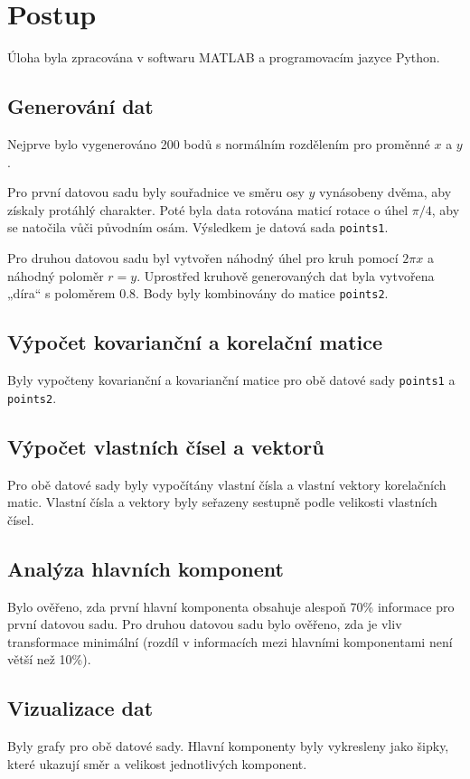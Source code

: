 \section{Postup}

Úloha byla zpracována v softwaru MATLAB a programovacím jazyce Python.

\subsection{Generování dat}
Nejprve bylo vygenerováno 200 bodů s normálním rozdělením pro proměnné \(x\) a \(y\).

Pro první datovou sadu byly souřadnice ve směru osy \(y\) vynásobeny dvěma, aby získaly protáhlý charakter. Poté byla data rotována maticí rotace o úhel \(\pi / 4\), aby se natočila vůči původním osám. Výsledkem je datová sada \texttt{points1}.

Pro druhou datovou sadu byl vytvořen náhodný úhel pro kruh pomocí \(2\pi x\) a náhodný poloměr \(r = y\). Uprostřed kruhově generovaných dat byla vytvořena „díra“ s poloměrem 0.8. Body byly kombinovány do matice \texttt{points2}.

\subsection{Výpočet kovarianční a korelační matice}
Byly vypočteny kovarianční a kovarianční matice pro obě datové sady \texttt{points1} a \texttt{points2}.

\subsection{Výpočet vlastních čísel a vektorů}
Pro obě datové sady byly vypočítány vlastní čísla a vlastní vektory korelačních matic. Vlastní čísla a vektory byly seřazeny sestupně podle velikosti vlastních čísel.

\subsection{Analýza hlavních komponent}
Bylo ověřeno, zda první hlavní komponenta obsahuje alespoň 70\% informace pro první datovou sadu. Pro druhou datovou sadu bylo ověřeno, zda je vliv transformace minimální (rozdíl v informacích mezi hlavními komponentami není větší než 10\%).

\subsection{Vizualizace dat}
Byly grafy pro obě datové sady. Hlavní komponenty byly vykresleny jako šipky, které ukazují směr a velikost jednotlivých komponent.